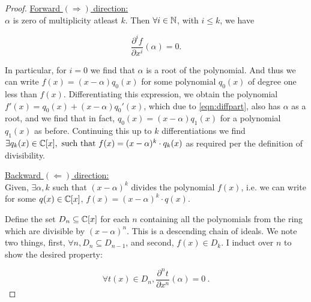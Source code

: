 \question

\begin{alphaparts}

    \questionpart 
        \begin{proof}
            \underline{Forward \((\Rightarrow)\) direction:}\\
            \(\alpha\) is zero of multiplicity atleast \(k\). Then \(\forall i
            \in \mathbb{N}\), with \(i \leq k\), we have 
            
            \begin{equation}
                \frac{\partial^i f}{\partial x^i}(\alpha) = 0. 
                \label{eqn:diffpart}
            \end{equation}

            In particular, for \(i = 0\) we find that \(\alpha\) is a root of
            the polynomial. And thus we can write \(f(x) = (x-\alpha)q_0(x)\)
            for some polynomial \(q_0(x)\) of degree one less than \(f(x)\).
            Differentiating this expression, we obtain the polynomial \(f'(x) =
            q_0(x) + (x - \alpha)q_0'(x)\), which due to \autoref{eqn:diffpart},
            also has \(\alpha\) as a root, and we find that in fact, \(q_0(x) =
            (x - \alpha)q_1(x)\) for a polynomial \(q_1(x)\) as before.
            Continuing this up to \(k\) differentiations we find \(\exists
            q_k(x) \in \mathbb{C}[x], \textnormal{ such that } f(x) =
            (x-\alpha)^k\cdot q_k(x)\) as required per the definition of
            divisibility.

            \underline{Backward \((\Leftarrow)\) direction:}\\
            Given, \(\exists \alpha, k\) such that \((x-\alpha)^k\) divides the
            polynomial \(f(x)\), i.e. we can write for some \(q(x) \in
            \mathbb{C}[x]\), \(f(x) = (x-\alpha)^k \cdot q(x)\).

            Define the set \(D_n \subseteq \mathbb{C}[x]\) for each \(n\)
            containing all the polynomials from the ring which are divisible by
            \((x-\alpha)^n\). This is a descending chain of ideals. We note two
            things, first, \(\forall n, D_n \subseteq D_{n-1}\), and second,
            \(f(x) \in D_k\). I induct over \(n\) to show the desired property:

            \begin{equation}
                \forall t(x) \in D_n, \frac{\partial^n t}{\partial x^n}(\alpha) = 0~.
                \label{eqn:inductpropd}
            \end{equation}


\end{proof}
\end{alphaparts}
